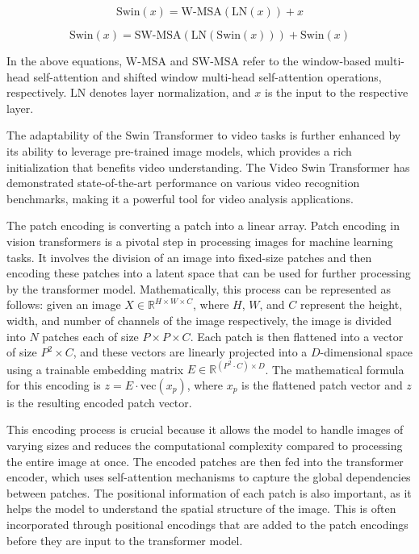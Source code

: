 \begin{spacing}{1.5}
\begin{sloppypar}
$$
\text{Swin}(x) = \text{W-MSA}(\text{LN}(x)) + x
$$

$$
\text{Swin}(x) = \text{SW-MSA}(\text{LN}(\text{Swin}(x))) + \text{Swin}(x)
$$

In the above equations, \( \text{W-MSA} \) and \( \text{SW-MSA} \) refer to the window-based multi-head self-attention and shifted window multi-head self-attention operations, respectively. \( \text{LN} \) denotes layer normalization, and \( x \) is the input to the respective layer.

The adaptability of the Swin Transformer to video tasks is further enhanced by its ability to leverage pre-trained image models, which provides a rich initialization that benefits video understanding. The Video Swin Transformer has demonstrated state-of-the-art performance on various video recognition benchmarks, making it a powerful tool for video analysis applications.


The patch encoding is converting a patch into a linear array. Patch encoding in vision transformers is a pivotal step in processing images for machine learning tasks. It involves the division of an image into fixed-size patches and then encoding these patches into a latent space that can be used for further processing by the transformer model. Mathematically, this process can be represented as follows: given an image \( X \in \mathbb{R}^{H \times W \times C} \), where \( H \), \( W \), and \( C \) represent the height, width, and number of channels of the image respectively, the image is divided into \( N \) patches each of size \( P \times P \times C \). Each patch is then flattened into a vector of size \( P^2 \times C \), and these vectors are linearly projected into a \( D \)-dimensional space using a trainable embedding matrix \( E \in \mathbb{R}^{(P^2 \cdot C) \times D} \). The mathematical formula for this encoding is \( z = E \cdot \text{vec}(x_p) \), where \( x_p \) is the flattened patch vector and \( z \) is the resulting encoded patch vector.

This encoding process is crucial because it allows the model to handle images of varying sizes and reduces the computational complexity compared to processing the entire image at once. The encoded patches are then fed into the transformer encoder, which uses self-attention mechanisms to capture the global dependencies between patches. The positional information of each patch is also important, as it helps the model to understand the spatial structure of the image. This is often incorporated through positional encodings that are added to the patch encodings before they are input to the transformer model.


\end{sloppypar}
\end{spacing}
